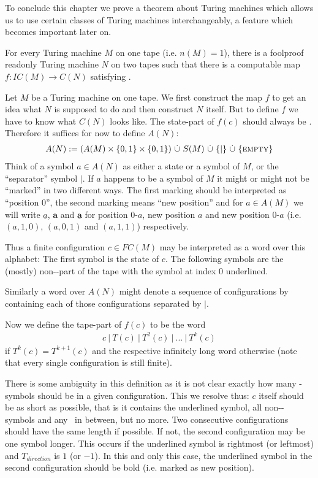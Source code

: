 To conclude this chapter we prove a theorem about Turing machines which allows us to use certain classes of Turing machines interchangeably, a feature which becomes important later on.
\begin{Theorem}
	For every Turing machine $M$ on one tape (i.e. $n(M) = 1$), there is a foolproof readonly Turing machine $N$ on two tapes such that
	there is a computable map $f: IC(M) \to C(N)$
	satisfying .
\end{Theorem}
\proof
	Let $M$ be a Turing machine on one tape.
	We first construct the map $f$ to get an idea what $N$ is supposed to do and then construct $N$ itself.
	But to define $f$ we have to know what $C(N)$ looks like.
	The state-part of $f(c)$ should always be \INI. Therefore it suffices for now to define $A(N)$:
	\begin{align*}
		A(N) := (A(M) \times \{0,1\} \times \{0,1\})~\dot\cup~S(M)~\dot\cup~\{|\}~\dot\cup~\{\text{\scshape{empty}}\}
	\end{align*}
	Think of a symbol $a \in A(N)$ as either a state or a symbol of $M$, or the ``separator'' symbol $|$.
	If $a$ happens to be a symbol of $M$ it might or might not be ``marked'' in two different ways.
	The first marking should be interpreted as ``position $0$'', the second marking means ``new position''
	and for $a \in A(M)$ we will write
	$\underline{a}$, $\boldsymbol{a}$ and $\underline{\boldsymbol{a}}$ for position $0$-$a$, new position $a$ and new position $0$-$a$ (i.e. $(a,1,0)$, $(a,0,1)$ and $(a,1,1)$) respectively.

	Thus a finite configuration $c \in FC(M)$ may be interpreted as a word over this alphabet:
	The first symbol is the state of $c$. The following symbols are the (mostly) non-\EMP-part of the tape with the symbol at index $0$ underlined.

	Similarly a word over $A(N)$ might denote a sequence of configurations by containing each of those configurations separated by $|$.

	Now we define the tape-part of $f(c)$ to be the word
	\begin{align*}
		c~|~T(c)~|~T^2(c)~|~...~|~T^k(c)
	\end{align*}
	if $T^k(c) = T^{k+1}(c)$ and the respective infinitely long word otherwise (note that every single configuration is still finite).

	There is some ambiguity in this definition as it is not clear exactly how many \EMP-symbols should be in a given configuration.
	This we resolve thus: $c$ itself should be as short as possible, that is it contains the underlined symbol, all non-\EMP-symbols and any \EMP~in between, but no more.
	Two consecutive configurations should have the same length if possible. If not, the second configuration may be one symbol longer.
	This occurs if the underlined symbol is rightmost (or leftmost) and $T_{direction}$ is $1$ (or $-1$).
	In this and only this case, the underlined symbol in the second configuration should be bold (i.e. marked as new position).

